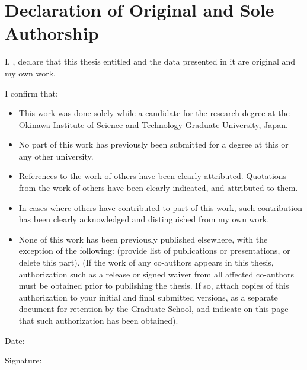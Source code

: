 \chapter*{Declaration of Original and Sole Authorship} 

I, \name, declare that this thesis entitled \emph{\thesistitle} and the data presented in it are original and my own work. 


I confirm that:
\begin{itemize}
\item This work was done solely while a candidate for the research degree at the Okinawa Institute of Science and Technology Graduate University, Japan.
\item No part of this work has previously been submitted for a degree at this or any other university.
\item References to the work of others have been clearly attributed. Quotations from the work of others have been clearly indicated, and attributed to them.
\item In cases where others have contributed to part of this work, such contribution has been clearly acknowledged and distinguished from my own work.
\item None of this work has been previously published elsewhere, with the exception of the following: (provide list of publications or presentations, or delete this part). 
(If the work of any co-authors appears in this thesis, authorization such as a release or signed waiver from all affected co-authors must be obtained prior to publishing the thesis.  If so, attach copies of this authorization to your initial and final submitted versions, as a separate document for retention by the Graduate School, and indicate on this page that such authorization has been obtained).  
\end{itemize}

Date:  \submissiondate

Signature: 
